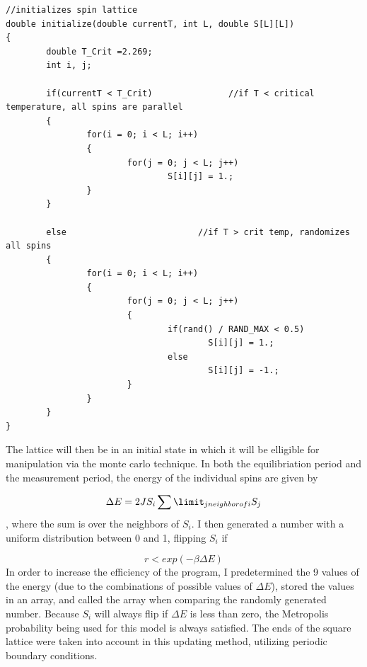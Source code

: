 \documentclass[10pt]{article}
\begin{document}
\begin{verbatim}
//initializes spin lattice
double initialize(double currentT, int L, double S[L][L])
{
        double T_Crit =2.269;
        int i, j;
        
        if(currentT < T_Crit)               //if T < critical temperature, all spins are parallel
        {
                for(i = 0; i < L; i++)
                {
                        for(j = 0; j < L; j++)
                                S[i][j] = 1.;
                }
        }
        
        else                          //if T > crit temp, randomizes all spins
        {
                for(i = 0; i < L; i++)
                {
                        for(j = 0; j < L; j++)
                        {
                                if(rand() / RAND_MAX < 0.5)
                                        S[i][j] = 1.;
                                else
                                        S[i][j] = -1.;
                        }
                }
        }
}
\end{verbatim}

The lattice will then be in an initial state in which it will be elligible for manipulation via the monte carlo technique. In both the equilibriation period and the measurement period, the energy of the individual spins are given by

$$\Delta E = 2JS_i \sum\limit_{j neighbor of i} S_j$$,
where the sum is over the neighbors of $S_i$. I then generated a number with a uniform distribution between 0 and 1, flipping $S_i$ if

$$r < exp(-\beta \Delta E)$$
In order to increase the efficiency of the program, I predetermined the 9 values of the energy (due to the combinations of possible values of $\Delta E$), stored the values in an array, and called the array when comparing the randomly generated number. Because $S_i$ will always flip if $\Delta E$ is less than zero, the Metropolis probability being used for this model is always satisfied. The ends of the square lattice were taken into account in this updating method, utilizing periodic boundary conditions.
\end{document}
